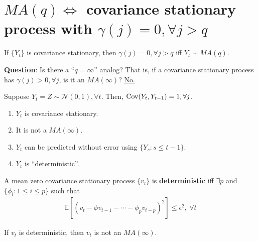 \documentclass[11pt]{elegantbook}
\begin{document}
\section{$MA(q)\Leftrightarrow$ covariance stationary process with $\gamma(j)=0,\forall j>q$}
\begin{proposition}[$MA(q)$ $\Leftrightarrow$ covariance stationary and $\gamma(j)=0,\forall j>q$]
    If $\{Y_t\}$ is covariance stationary, then $\gamma(j)=0,\forall j>q$ iff $Y_t\sim MA(q)$.
\end{proposition}
\textbf{Question}: Is there a ``$q=\infty$'' analog? That is, if a covariance stationary process has $\gamma(j)>0,\forall j$, is it an $MA(\infty)$? \underline{No.}
\begin{example}[ (Counterexample)]
    Suppose $Y_t=Z\sim \mathcal{N}(0,1), \forall t$. Then, $\textnormal{Cov}(Y_t,Y_{t-1})=1,\forall j$.
    \begin{enumerate}
        \item $Y_t$ is covariance stationary.
        \item It is not a $MA(\infty)$.
        \item $Y_t$ can be predicted without error using $\{Y_s:s\leq t-1\}$.
        \item $Y_t$ is ``deterministic''.
    \end{enumerate}
\end{example}
\begin{definition}[Deterministic]
    A mean zero covariance stationary process $\{v_t\}$ is \textbf{deterministic} iff $\exists p$ and $\{\phi_i:1\leq i\leq p\}$ such that
    \begin{equation}
        \begin{aligned}
            \mathbb{E}[(v_t-\phi v_{t-1}-\cdots -\phi_p v_{t-p})^2]\leq \epsilon^2,\ \forall t
        \end{aligned}
        \nonumber
    \end{equation}
\end{definition}
\begin{claim}
    If $v_t$ is deterministic, then $v_t$ is not an $MA(\infty)$.
\end{claim}
\end{document}
